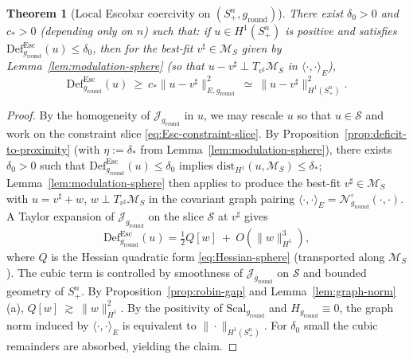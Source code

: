 \documentclass[11pt,reqno,a4paper]{amsart}
\numberwithin{equation}{section}
\newcommand{\Def}{\mathrm{Def}}
\theoremstyle{plain}
\newtheorem{theorem}{Theorem}[section]
\newcommand{\Scal}{\mathrm{Scal}}
\theoremstyle{remark}
\theoremstyle{plain}
\begin{document}
\begin{theorem}[Local Escobar coercivity on $(S^n_+,g_{\mathrm{round}})$]\label{thm:local-esc-sphere}
There exist $\delta_0>0$ and $c_*>0$ (depending only on $n$) such that: if $u\in H^1(S^n_+)$ is \emph{positive} and satisfies
$\Def^{\mathrm{Esc}}_{g_{\mathrm{round}}}(u)\le\delta_0$, then for the best-fit $v^\sharp\in\mathcal M_S$ given by Lemma~\ref{lem:modulation-sphere} (so that $u-v^\sharp\perp T_{v^\sharp}\mathcal M_S$ in $\langle\cdot,\cdot\rangle_{E}$),
\[
  \Def^{\mathrm{Esc}}_{g_{\mathrm{round}}}(u)\ \ge\ c_*\|u-v^\sharp\|_{E,g_{\mathrm{round}}}^2
  \ \simeq\ \|u-v^\sharp\|_{H^1(S^n_+)}^2.
\]
\end{theorem}

\begin{proof}
By the homogeneity of $\mathcal J_{g_{\mathrm{round}}}$ in $u$, we may rescale $u$ so that $u\in\mathcal S$ and work on the constraint slice \eqref{eq:Esc-constraint-slice}. By Proposition~\ref{prop:deficit-to-proximity} (with $\eta:=\delta_\ast$ from Lemma~\ref{lem:modulation-sphere}), there exists $\delta_0>0$ such that $\Def^{\mathrm{Esc}}_{g_{\mathrm{round}}}(u)\le\delta_0$ implies $\mathrm{dist}_{H^1}(u,\mathcal M_S)\le\delta_\ast$; Lemma~\ref{lem:modulation-sphere} then applies to produce the best-fit $v^\sharp\in\mathcal M_S$ with $u=v^\sharp+w$, $w\perp T_{v^\sharp}\mathcal M_S$ in the covariant graph pairing $\langle\cdot,\cdot\rangle_{E}=\mathcal N^\circ_{g_{\mathrm{round}}}(\cdot,\cdot)$. A Taylor expansion of $\mathcal J_{g_{\mathrm{round}}}$ on the slice $\mathcal S$ at $v^\sharp$ gives
\[
  \Def^{\mathrm{Esc}}_{g_{\mathrm{round}}}(u)
  = \tfrac12Q[w]\ +\ O(\|w\|_{H^1}^3),
\]
where $Q$ is the Hessian quadratic form \eqref{eq:Hessian-sphere} (transported along $\mathcal M_S$). The cubic term is controlled by smoothness of $\mathcal J_{g_{\mathrm{round}}}$ on $\mathcal S$ and bounded geometry of $S^n_+$. By Proposition~\ref{prop:robin-gap} and Lemma~\ref{lem:graph-norm}(a),
$
Q[w]\ \gtrsim\ \|w\|_{H^1}^2.
$
By the positivity of $\Scal_{g_{\mathrm{round}}}$ and $H_{g_{\mathrm{round}}}\equiv0$, the graph norm induced by $\langle\cdot,\cdot\rangle_{E}$ is equivalent to $\|\cdot\|_{H^1(S^n_+)}$. For $\delta_0$ small the cubic remainders are absorbed, yielding the claim.
\end{proof}
\end{document}
